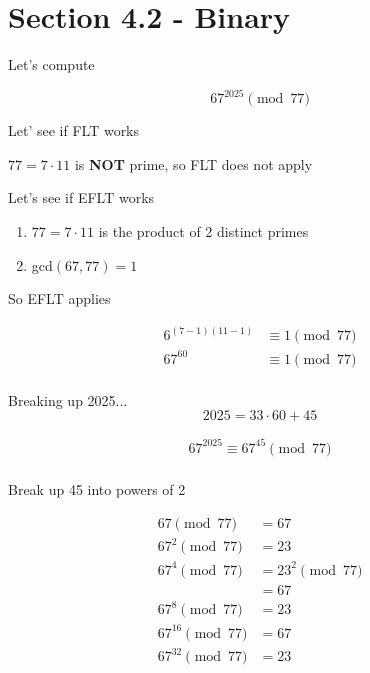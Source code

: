 \documentclass[../../Main.tex]{subfiles}
\begin{document}
\section{Section 4.2 - Binary}

Let's compute

$$67^2025 \pmod{77}$$

\begin{work}

    Let' see if FLT works

    \begin{center}
        $77 = 7 \cdot 11$ is \textbf{NOT} prime, so FLT does not apply
    \end{center}

    Let's see if EFLT works

    \begin{center}
        \begin{enumerate}
            \item $77 = 7 \cdot 11$ is the product of 2 distinct primes
            \item gcd$(67, 77) = 1$
        \end{enumerate}

        So EFLT applies
    \end{center}

    \begin{align*}
        6^{(7 - 1)(11 - 1)} &\equiv 1 \pmod{77} \\
        67^{60} &\equiv 1 \pmod{77} \\
    \end{align*}

    Breaking up 2025...
    $$2025 = 33 \cdot 60 + 45$$

    \begin{align*}
        67^{2025} \equiv 67^{45} \pmod{77} \\
    \end{align*}

    Break up 45 into powers of 2

    \begin{align*}
        67 \pmod{77} &= 67 \\
        67^2 \pmod{77} &= 23 \\
        67^4 \pmod{77} &= 23^2 \pmod{77} \\
        &= 67 \\
        67^8 \pmod{77} &= 23 \\
        67^{16} \pmod{77} &= 67 \\
        67^{32} \pmod{77} &= 23 \\
    \end{align*}


\end{work}
\end{document}

